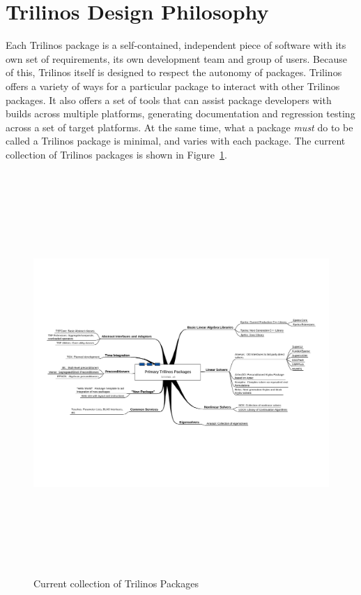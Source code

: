 \documentclass[12pt,relax]{TrilinosOverview}
\begin{document}
\section{Trilinos Design Philosophy}
\label{sect:TrilinosDesign}
Each Trilinos package is a self-contained, independent piece
of software with its own set of requirements, its own development team
and group of users.  Because of this,
Trilinos itself is designed to respect the autonomy of packages.
Trilinos offers a variety of ways for a particular package to interact 
with other Trilinos packages.  It also offers a set of tools that can
assist package developers with builds across multiple platforms, generating
documentation and regression testing across a set of target platforms.
At the same time, what a package {\it must} do to be called a Trilinos
package is minimal, and varies with each package.  The current
collection of Trilinos packages is shown in Figure~\ref{Figure:TrilinosPackages}.

\begin{figure}
\begin{center}
\includegraphics[height=6in,angle=90]{../CommonFiles/TrilinosPackagesDiagram}
\end{center}
\caption{\label{Figure:TrilinosPackages}Current collection of Trilinos Packages}
\end{figure}
\end{document}

